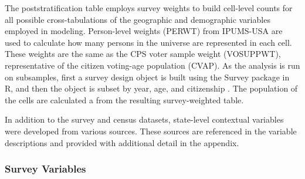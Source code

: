The poststratification table employs survey weights to build cell-level counts for all possible cross-tabulations of the geographic and demographic variables employed in modeling. Person-level weights (PERWT) from IPUMS-USA are used to calculate how many persons in the universe are represented in each cell. These weights are the same as the CPS voter sample weight (VOSUPPWT), representative of the citizen voting-age population (CVAP). As the analysis is run on subsamples, first a survey design object is built using the Survey package in R, and then the object is subset by year, age, and citizenship  \citep{lumley_survey_2020}. The population of the cells are calculated a from the resulting survey-weighted table.    

In addition to the survey and census datasets, state-level contextual variables were developed from various sources. These sources are referenced in the variable descriptions and provided with additional detail in the appendix.  

\subsubsection{Survey Variables}

